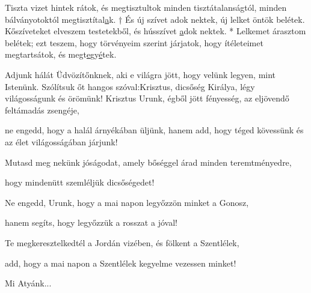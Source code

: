 \documentclass[twoside]{article}
\begin{document}


\begin{psalmsheet}[tone=8, continuous, number={150. zsoltár}, title={Dicsérjétek az Urat!}, motto={Daloljon a lelketek, daloljon a szívetek is, vagyis dicsőítsétek meg Istent lelketekben és testetekben egyaránt! (Hesychius)}]
\end{psalmsheet}

Tiszta vizet hintek rátok, és megtisztultok minden tisztátalanságtól, minden bálványotoktól
megtisztítal\underline{a}k. † És új szívet adok nektek, új lelket öntök belétek. Kőszíveteket
elveszem testetekből, és hússzívet \underline{a}dok nektek. * Lelkemet árasztom belétek; ezt teszem,
hogy törvényeim szerint járjatok, hogy ítéleteimet megtartsátok, és
megt\underline{e}gy\underline{é}tek.






\begin{preces}{Adjunk hálát Üdvözítőnknek, aki e világra jött, hogy velünk legyen, mint Istenünk.
Szólítsuk őt hangos szóval:}{Krisztus, dicsőség Királya, légy világosságunk és örömünk!}
  Krisztus Urunk, égből jött fényesség, az eljövendő feltámadás zsengéje,

  \reddash ne engedd, hogy a halál árnyékában üljünk, hanem add, hogy téged kövessünk és az élet világosságában járjunk!

  Mutasd meg nekünk jóságodat, amely bőséggel árad minden teremtményedre,

  \reddash hogy mindenütt szemléljük dicsőségedet!

  Ne engedd, Urunk, hogy a mai napon legyőzzön minket a Gonosz,

  \reddash hanem segíts, hogy legyőzzük a rosszat a jóval!

  Te megkeresztelkedtél a Jordán vizében, és fölkent a Szentlélek,

  \reddash add, hogy a mai napon a Szentlélek kegyelme vezessen minket!
\end{preces}
Mi Atyánk...
\end{document}
